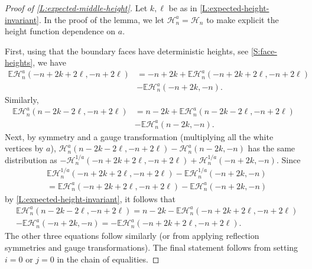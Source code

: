 \documentclass[11pt,twoside]{amsart}
\theoremstyle{plain}
\numberwithin{quest}{section}
\theoremstyle{remark}
\numberwithin{rem}{section}
\theoremstyle{definition}
\begin{document}
	
	\begin{proof}[Proof of \cref{L:expected-middle-height}]
		
		
		
		
		
		Let $k,\ell$ be as in \cref{L:expected-height-invariant}.  In the proof of the lemma, we let $\mathcal{H}_n^a=\mathcal{H}_n$ to make explicit the height function dependence on $a$. 

        First, using that the boundary faces have deterministic heights, see \cref{S:face-heights}, we have 
        \begin{equation*}
			\begin{split}
				\mathbb{E}\mathcal{H}_n^a(-n+2k+2\ell,-n+2\ell)&=-n+2k+\mathbb{E}\mathcal{H}_n^a(-n+2k+2\ell,-n+2\ell)\\&-\mathbb{E}\mathcal{H}_n^a(-n+2k,-n).
			\end{split}
		\end{equation*}
		Similarly, 
		\begin{equation*}
			\begin{split}
				\mathbb{E}\mathcal{H}_n^a(n-2k-2\ell,-n+2\ell)&=n-2k+\mathbb{E}\mathcal{H}_n^a(n-2k-2\ell,-n+2\ell)\\&-\mathbb{E}\mathcal{H}_n^a(n-2k,-n).
			\end{split}
		\end{equation*}
		Next, by symmetry and a gauge transformation (multiplying all the white vertices by $a$), $\mathcal{H}_n^a(n-2k-2\ell,-n+2\ell)-\mathcal{H}_n^a(n-2k,-n)$ has the same distribution as $-\mathcal{H}_n^{1/a}(-n+2k+2\ell,-n+2\ell)+\mathcal{H}_n^{1/a}(-n+2k,-n)$.  Since 
		\begin{equation*}
			\begin{split}
				&\mathbb{E}\mathcal{H}_n^{1/a}(-n+2k+2\ell,-n+2\ell)-\mathbb{E}\mathcal{H}_n^{1/a}(-n+2k,-n)\\&=\mathbb{E}\mathcal{H}_n^{a}(-n+2k+2\ell,-n+2\ell)-\mathbb{E}\mathcal{H}_n^{a}(-n+2k,-n) 
			\end{split}
		\end{equation*}
		by \cref{L:expected-height-invariant}, it follows that 
		\begin{equation*}
			\begin{split}
				&\mathbb{E}\mathcal{H}^a_n(n-2k-2\ell,-n+2\ell)=n-2k-\mathbb{E}\mathcal{H}^a_n(-n+2k+2\ell,-n+2\ell)\\&-\mathbb{E}\mathcal{H}^a_n(-n+2k,-n)=-\mathbb{E}\mathcal{H}^a_n(-n+2k+2\ell,-n+2\ell).
			\end{split}
		\end{equation*}
		The other three equations follow similarly (or from applying reflection symmetries and gauge transformations). The final statement follows from setting $i = 0$ or $j = 0$ in the chain of equalities.
		        \end{proof}
	
\end{document}
